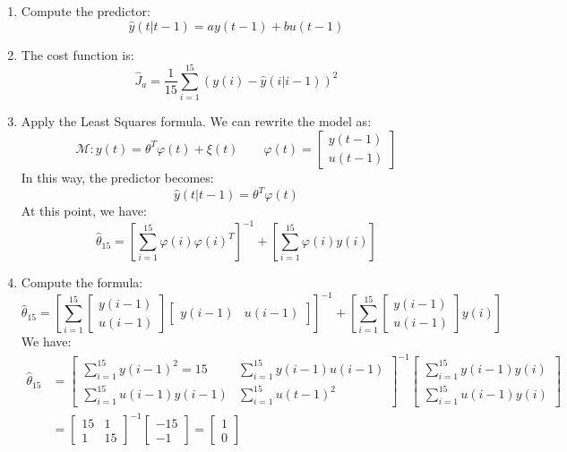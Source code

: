 \begin{enumerate}
    \item Compute the predictor: 
        \[\hat{y}(t|t-1)=ay(t-1)+bu(t-1)\]
    \item The cost function is: 
        \[\hat{J}_a=\dfrac{1}{15}\sum_{i=1}^{15}{\left(y(i)-\hat{y}(i|i-1)\right)}^2\]
    \item Apply the Least Squares formula.
        We can rewrite the model as:
        \[\mathcal{M}:y(t)=\theta^T\varphi(t)+\xi(t)\qquad \varphi(t)=\begin{bmatrix}y(t-1) \\ u(t-1) \end{bmatrix}\]
        In this way, the predictor becomes:
        \[\hat{y}(t|t-1)=\theta^T\varphi(t)\]
        At this point, we have:
        \[\hat{\theta}_{15}={\left[\sum_{i=1}^{15}\varphi(i){\varphi(i)}^T\right]}^{-1}+\left[\sum_{i=1}^{15}\varphi(i)y(i)\right]\]
    \item Compute the formula:
        \[\hat{\theta}_{15}={\left[\sum_{i=1}^{15}\begin{bmatrix}y(i-1) \\ u(i-1) \end{bmatrix}\begin{bmatrix}y(i-1) & u(i-1) \end{bmatrix}\right]}^{-1}+\left[\sum_{i=1}^{15}\begin{bmatrix}y(i-1) \\ u(i-1) \end{bmatrix}y(i)\right]\]
        We have:
        \begin{align*}
            \hat{\theta}_{15} &=\begin{bmatrix}
                                \sum_{i=1}^{15}{y(i-1)}^2=15 &  \sum_{i=1}^{15}y(i-1)u(i-1) \\
                                \sum_{i=1}^{15}u(i-1)y(i-1) & \sum_{i=1}^{15}{u(t-1)}^2
                            \end{bmatrix}^{-1} \begin{bmatrix}
                                \sum_{i=1}^{15}y(i-1)y(i) \\
                                \sum_{i=1}^{15}u(i-1)y(i)
                            \end{bmatrix} \\
                            &=\begin{bmatrix}
                                15 & 1 \\
                                1 & 15
                            \end{bmatrix}^{-1} \begin{bmatrix}
                                -15 \\
                                -1
                            \end{bmatrix}=\begin{bmatrix}
                                1 \\
                                0
                            \end{bmatrix}
        \end{align*}
\end{enumerate}